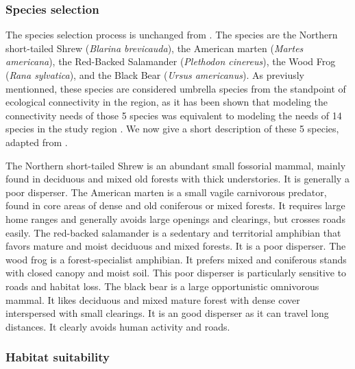 \subsubsection{Species selection}

The species selection process is unchanged from \cite{rayfield_priorisation_2018}. The species are the Northern short-tailed Shrew (\textit{Blarina brevicauda}), the American marten (\textit{Martes americana}), the Red-Backed Salamander (\textit{Plethodon cinereus}), the Wood Frog (\textit{Rana sylvatica}), and the Black Bear (\textit{Ursus americanus}). As previusly mentionned, these  species are considered umbrella species from the standpoint of ecological connectivity in the region, as it has been shown that modeling the connectivity needs of those 5 species was equivalent to modeling the needs of 14 species in the study region \citep{meurant_selecting_2018}. We now give a short description of these 5 species, adapted from \cite{albert_applying_2017}.

The Northern short-tailed Shrew is an abundant small fossorial mammal, mainly found in deciduous and mixed old forests with thick understories. It is generally a poor disperser. The American marten is a small vagile carnivorous predator, found in core areas of dense and old coniferous or mixed forests. It requires large home ranges and generally avoids large openings and clearings, but crosses roads easily. The red-backed salamander is a sedentary and territorial amphibian that favors mature and moist deciduous and mixed forests. It is a poor disperser. The wood frog is a forest-specialist amphibian. It prefers mixed and coniferous stands with closed canopy and moist soil. This poor disperser is particularly sensitive to roads and habitat loss. The black bear is a large opportunistic omnivorous mammal. It likes deciduous and mixed mature forest with dense cover interspersed with small clearings. It is an good disperser as it can travel long distances. It clearly avoids human activity and roads.\\

\subsubsection{Habitat suitability}

